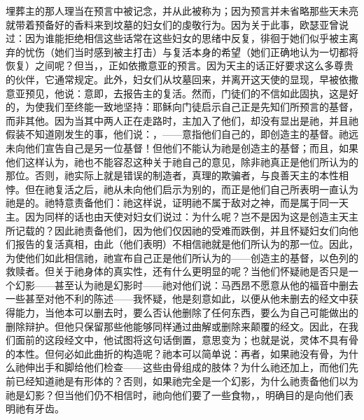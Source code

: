 埋葬主的那人理当在预言中被记念，并从此被称为；因为预言并未省略那些天未亮就带着预备好的香料来到坟墓的妇女们的虔敬行为。因为关于此事，欧瑟亚曾说过：因为谁能拒绝相信这些话常在这些妇女的思绪中反复，徘徊于她们似乎被主离弃的忧伤（她们当时感到被主打击）与复活本身的希望（她们正确地认为一切都将恢复）之间呢？但当，，正如依撒意亚的预言。因为天主的话正好要求这么多尊贵的伙伴，它通常规定。此外，妇女们从坟墓回来，并离开这天使的显现，早被依撒意亚预见，他说：意即，去报告主的复活。然而，门徒们的不信如此固执，这是好的，为使我们至终能一致地坚持：耶稣向门徒启示自己正是先知们所预言的基督，而非其他。因为当其中两人正在走路时，主加入了他们，却没有显出是祂，并且祂假装不知道刚发生的事，他们说：，——意指他们自己的，即创造主的基督。祂远未向他们宣告自己是另一位基督！但他们不能认为祂是创造主的基督；而且，如果他们这样认为，祂也不能容忍这种关于祂自己的意见，除非祂真正是他们所认为的那位。否则，祂实际上就是错误的制造者，真理的欺骗者，与良善天主的本性相悖。但在祂复活之后，祂从未向他们启示为别的，而正是他们自己所表明一直认为祂是的。祂特意责备他们：祂这样说，证明祂不属于敌对之神，而是属于同一天主。因为同样的话也由天使对妇女们说过：为什么呢？岂不是因为这是创造主天主所记载的？因此祂责备他们，因为他们仅因祂的受难而跌倒，并且怀疑妇女们向他们报告的复活真相，由此（他们表明）不相信祂就是他们所认为的那一位。因此，为使他们如此相信祂，祂宣布自己正是他们所认为的——创造主的基督，以色列的救赎者。但关于祂身体的真实性，还有什么更明显的呢？当他们怀疑祂是否只是一个幻影——甚至认为祂是幻影时——祂对他们说：马西昂不愿意从他的福音中删去一些甚至对他不利的陈述——我怀疑，他是刻意如此，以便从他未删去的经文中获得能力，当他本可以删去时，要么否认他删除了任何东西，要么为自己可能做出的删除辩护。但他只保留那些他能够同样通过曲解或删除来颠覆的经文。因此，在我们面前的这段经文中，他试图将这句话倒置，意思变为；也就是说，灵体不具有骨的本性。但何必如此曲折的构造呢？祂本可以简单说：再者，如果祂没有骨，为什么祂伸出手和脚给他们检查——这些由骨组成的肢体？为什么祂还加上，而他们先前已经知道祂是有形体的？否则，如果祂完全是一个幻影，为什么祂责备他们以为祂是幻影？但当他们仍不相信时，祂向他们要了一些食物，，明确目的是向他们表明祂有牙齿。\par

